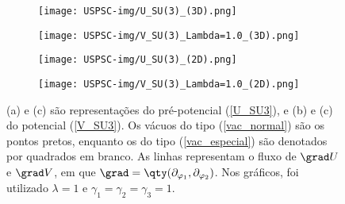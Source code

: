 \begin{figure}[ht] 
  \begin{subfigure}[b]{0.5\linewidth}
    \centering
    \texttt{[image: USPSC-img/U\_SU(3)\_(3D).png]} 
    \caption{} 
    \label{fig7:a} 
    \vspace{4ex}
  \end{subfigure}%
  \begin{subfigure}[b]{0.5\linewidth}
    \centering
    \texttt{[image: USPSC-img/V\_SU(3)\_Lambda=1.0\_(3D).png]} 
    \caption{} 
    \label{fig7:b} 
    \vspace{4ex}
  \end{subfigure} 
  \begin{subfigure}[b]{0.5\linewidth}
    \centering
    \texttt{[image: USPSC-img/U\_SU(3)\_(2D).png]} 
    \caption{} 
    \label{fig7:c} 
  \end{subfigure}%
  \begin{subfigure}[b]{0.5\linewidth}
    \centering
    \texttt{[image: USPSC-img/V\_SU(3)\_Lambda=1.0\_(2D).png]} 
    \caption{} 
    \label{fig7:d} 
  \end{subfigure} 
  \caption{(a) e (c) são representações do pré-potencial (\ref{U_SU3}), e (b) e (c) do potencial (\ref{V_SU3}). Os vácuos do tipo (\ref{vac_normal}) são os pontos pretos, enquanto os do tipo (\ref{vac_especial}) são denotados por quadrados em branco. As linhas representam o fluxo de $\grad U$ e $\grad V$, em que $\grad = \qty(\partial_{\varphi_1}, \partial_{\varphi_2})$. Nos gráficos, foi utilizado $\lambda = 1$ e $\gamma_1 = \gamma_2 = \gamma_3 = 1$.}
  \label{fig7} 
\end{figure}
